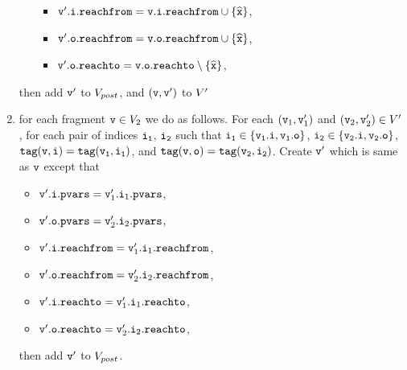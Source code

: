 \begin{enumerate}
\begin{itemize}
\begin{itemize}
 \item $\mathtt{v}'.\mathtt{i}.\mathtt{reachfrom} = \mathtt{v}.\mathtt{i}.\mathtt{reachfrom} \cup \left\{\widehat{\mathtt{x}}\right\}$,
\item $\mathtt{v}'.\mathtt{o}.\mathtt{reachfrom} = \mathtt{v}.\mathtt{o}.\mathtt{reachfrom} \cup \left\{\widehat{\mathtt{x}}\right\}$,
\item $\mathtt{v}'.\mathtt{o}.\mathtt{reachto} = \mathtt{v}.\mathtt{o}.\mathtt{reachto} \setminus \left\{\widehat{\mathtt{x}}\right\}$,
\end{itemize}
\end{itemize}
then add $\mathtt{v}'$ to $V_{post}$, and $(\mathtt{v},\mathtt{v}')$ to $V'$
\item for each fragment $\mathtt{v} \in V_2$ we do as follows. For each $(\mathtt{v}_1,\mathtt{v}_1')$ and $(\mathtt{v}_2,\mathtt{v}_2') \in V'$, for each pair of indices $\tt i_1$, $\tt i_2$ such that $\tt i_1 \in \{\mathtt{v}_1.i, \mathtt{v}_1.o\}$, $\tt i_2 \in \{\mathtt{v}_2.i, \mathtt{v}_2.o\}$, $\tt tag(v,i) = tag(\mathtt{v}_1, i_1)$, and $\tt tag(v,o) = tag(\mathtt{v}_2, i_2)$.
 Create $\mathtt{v}'$ which is same as $\mathtt{v}$ except that 
\begin{itemize}
\item $\mathtt{v}'.\mathtt{i}.\mathtt{pvars} = \mathtt{v}_1'.\mathtt{i}_1.\mathtt{pvars}$,
\item $\mathtt{v}'.\mathtt{o}.\mathtt{pvars} = \mathtt{v}_2'.\mathtt{i}_2.\mathtt{pvars}$,
\item $\mathtt{v}'.\mathtt{i}.\mathtt{reachfrom} = \mathtt{v}_1'.\mathtt{i}_1.\mathtt{reachfrom}$,
\item $\mathtt{v}'.\mathtt{o}.\mathtt{reachfrom} = \mathtt{v}_2'.\mathtt{i}_2.\mathtt{reachfrom}$,
\item $\mathtt{v}'.\mathtt{i}.\mathtt{reachto} = \mathtt{v}_1'.\mathtt{i}_1.\mathtt{reachto}$,
\item $\mathtt{v}'.\mathtt{o}.\mathtt{reachto} =  \mathtt{v}_2'.\mathtt{i}_2.\mathtt{reachto}$,
\end{itemize} then add $\mathtt{v}'$ to $V_{post}$. 
\end{enumerate}
